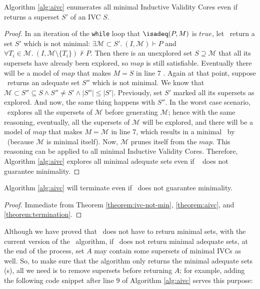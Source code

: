 \begin{theorem}
\label{theorem:ivc-not-min}
  Algorithm \ref{alg:aivc} enumerates all minimal Inductive Validity Cores
  even if \getivc returns a superset $S'$ of an IVC $S$.
\end{theorem}
\begin{proof}
In an iteration of the \texttt{while} loop that $\isadeq (P, M)$ is $true$,
let \getivc ~return a set $S'$ which is not minimal:
$\exists \mathcal{M} \subset S'.~ (I, \mathcal{M}) \vdash P$ and
$\forall T_i \in \mathcal{M} . ~ (I, \mathcal{M} \setminus \{T_i\}) \nvdash P$.
Then there is an unexplored set $S \supseteq \mathcal{M}$ that all its supersets have already been explored, so $map$ is still satisfiable.
Eventually there will be a model of $map$ that makes $M = S$ in line 7 .
Again at that point, suppose \getivc ~returns an adequate set $S''$ which is not minimal.
We know that
  $\mathcal{M} \subset S'' \subseteq S \wedge S'' \neq S' \wedge |S''| \leq |S'|$.
  Previously, set $S'$ marked all its supersets as explored. And now, the
  same thing happens with $S''$.
  In the worst case scenario, \getivc
   ~explores all the supersets of $\mathcal{M}$
   before generating $\mathcal{M}$; hence with the same reasoning,
  eventually, all the supersets of $\mathcal{M}$ will be explored, and there will be a model of $map$ that makes $M = \mathcal{M}$ in line 7,
  which results in a minimal \ivc\ by \getivc ~(because $\mathcal{M}$ is minimal itself).
  Now,  $\mathcal{M}$  prunes itself from the $map$.
  This reasoning can be applied to all minimal Inductive Validity Cores.
  Therefore, Algorithm \ref{alg:aivc} explores all minimal adequate sets even if \getivc ~
  does not guarantee minimality.
\end{proof}

\begin{theorem}
 Algorithm \ref{alg:aivc} will terminate even if \getivc ~does not guarantee minimality.
\end{theorem}
\begin{proof}
  Immediate from Theorem \ref{theorem:ivc-not-min}, \ref{theorem:aivc}, and \ref{theorem:termination}.
\end{proof}

Although we have proved that \getivc ~does not have to return minimal sets,
with the current version of the \aivcalg ~algorithm, if \getivc ~does not
return minimal adequate sets, at the end of the process,
 set $A$ may contain some supersets of
minimal IVCs as well. So, to make sure that the algorithm only returns
the minimal adequate sets (\ivc s), all we need is to
remove supersets before returning $A$; for example, adding the following code snippet after line 9 of Algorithm \ref{alg:aivc} serves this purpose:

